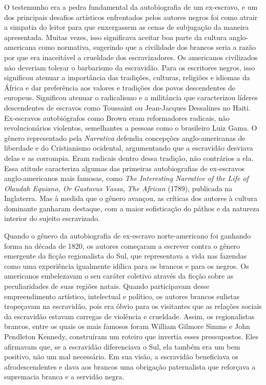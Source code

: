 O testemunho era a pedra fundamental da autobiografia de um ex-escravo,
e um dos principais desafios artísticos enfrentados pelos autores negros
foi como atrair a simpatia do leitor para que enxergassem as cenas de
subjugação da maneira apresentada. Muitas vezes, isso significava
aceitar boa parte da cultura anglo-americana como normativa, sugerindo
que a civilidade dos brancos seria a razão por que era inaceitável a
crueldade dos escravizadores. Os americanos civilizados não deveriam
tolerar o barbarismo da escravidão. Para os escritores negros, isso
significou atenuar a importância das tradições, culturas, religiões e
idiomas da África e dar preferência aos valores e tradições dos povos
descendentes de europeus. Significou atenuar o radicalismo e a
militância que caracterizou líderes descendentes de escravos como
Toussaint ou Jean-Jacques Dessalines no Haiti. Ex-escravos autobiógrafos
como Brown eram reformadores radicais, não revolucionários violentos,
semelhantes a pessoas como o brasileiro Luiz Gama. O gênero representado
pela \emph{Narrativa} defendia concepções anglo-americanas de liberdade
e do Cristianismo ocidental, argumentando que a escravidão desviava
delas e as corrompia. Eram radicais dentro dessa tradição, não
contrários a ela. Essa atitude caracteriza algumas das primeiras
autobiografias de ex-escravos anglo-americanos mais famosas, como
\emph{The Interesting Narrative of the Life of Olaudah Equiano, Or}
\emph{Gustavus Vassa}, \emph{The African} (1789), publicada na
Inglaterra. Mas à medida que o gênero avançou, as críticas dos autores à
cultura dominante ganharam destaque, com a maior sofisticação do páthos
e da natureza interior do sujeito escravizado.

Quando o gênero da autobiografia de ex-escravo norte-americano foi
ganhando forma na década de 1820, os autores começaram a escrever contra
o gênero emergente da ficção regionalista do Sul, que representava a
vida nas fazendas como uma experiência igualmente idílica para os
brancos e para os negros.\protect\hypertarget{_Hlk505155236}{}{} Os
americanos embelezavam o seu caráter coletivo através da ficção sobre as
peculiaridades de suas regiões natais. Quando participavam desse
empreendimento artístico, intelectual e político, os autores brancos
sulistas tropeçavam na escravidão, pois era óbvio para os visitantes que
as relações sociais da escravidão estavam carregas de violência e
crueldade. Assim, os regionalistas brancos, entre os quais os mais
famosos foram William Gilmore Simms e John Pendleton Kennedy,
construíram um roteiro que invertia esses pressupostos. Eles afirmavam
que, se a escravidão diferenciava o Sul, ela também era um bem positivo,
não um mal necessário. Em sua visão, a escravidão beneficiava os
afrodescendentes e dava aos brancos uma obrigação paternalista que
reforçava a supremacia branca e a servidão negra.

